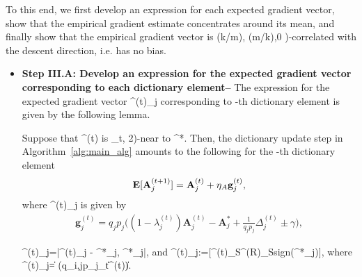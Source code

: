 \documentclass{article}
\newcommand{\sgn}{{\rm sign}}
\def\[#1\]{{$#1$}}
\def\b#1{{\mathbf{#1}}}
\begin{document}
 To this end, we first develop an expression for each expected gradient vector, show that the empirical gradient estimate concentrates around its mean, and finally show that the empirical gradient vector is \[(\Omega(k/m), \Omega(m/k),0 )\]-correlated with the descent direction, i.e. has no bias.
























\begin{itemize}
\item\textbf{Step III.A: Develop an expression for the expected gradient vector corresponding to each dictionary element--}\label{Step III.A}
The expression for the expected gradient vector \[\b{g}^{(t)}_j \] corresponding to \[j\]-th dictionary element is given by the following lemma.
\begin{lemma}\label{grad_exp}
	Suppose that \[\b{A}^{(t)}\] is \[(\epsilon_t, 2)\]-near to \[\b{A}^*\]. Then, the dictionary update step in Algorithm~\ref{alg:main_alg} amounts to the following for the \[j\]-th dictionary element
	\vspace{-5pt}
		\begin{align*}
		\b{E}[\b{A}^{(t+1)}_j] = \b{A}^{(t)}_j + \eta_A \b{g}^{(t)}_j,
		\vspace{-5pt}
		\end{align*}	
		where \[\b{g}^{(t)}_j\] is given by
			\vspace{-5pt}
		\begin{align*}
		\b{g}^{(t)}_j = q_j p_j \big((1 - \lambda^{(t)}_j)\b{A}^{(t)}_j- \b{A}^*_j + \tfrac{1}{q_j p_j}\Delta^{(t)}_j \pm \gamma\big),
		\end{align*}
		









	\[\lambda^{(t)}_{j}=|\langle \b{A}^{(t)}_j - \b{A}^{*}_j, \b{A}^*_j\rangle|\], and \[\Delta^{(t)}_j:=\b{E}[\b{A}^{(t)}_S\vartheta^{(R)}_S\sgn(\b{x}^*_j)]\], where \[\|\Delta^{(t)}_{j}\|= (q_{i,j}p_{j}\epsilon_t\|\b{A}^{(t)}\|)\].
	


\end{lemma}
\end{itemize}
\end{document}
